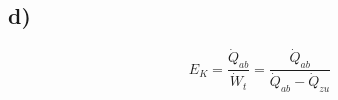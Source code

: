 

\subsection*{d)}
\[
E_K = \frac{\dot{Q}_{ab}}{\dot{W}_t} = \frac{\dot{Q}_{ab}}{\dot{Q}_{ab} - \dot{Q}_{zu}}
\]
